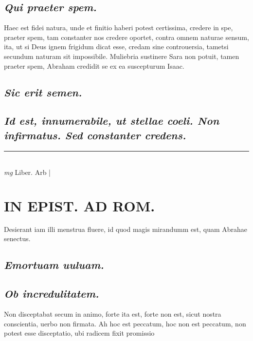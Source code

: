 \documentclass{article}
\begin{document}
\begin{pages}
\subsection*{\textit{Qui praeter spem. }}\pstart Haec est fidei natura, unde et finitio haberi potest certissima, credere in spe, praeter spem, tam constanter nos credere oportet, contra omnem naturae sensum, ita, ut si Deus ignem frigidum dicat esse, credam sine controuersia, tametsi secundum naturam sit impossibile. Muliebria sustinere Sara non potuit, tamen praeter spem, Abraham credidit se ex ea suscepturum Isaac.   \pend
{}
{}
\subsection*{\textit{Sic erit semen. }}
{}
\subsection*{\textit{Id est, innumerabile, ut stellae coeli.  Non infirmatus. Sed constanter credens.  }}
\vspace{0.5cm}\noindent
\vspace{0.2cm}\rule{1cm}{0.2pt}\\ 
\hspace{0.2cm}\textit{mg}
\footnotesize Liber. Arb 
\normalsize| 
\section*{IN EPIST. AD ROM.  }
\marginpar{[ p.45 ]}\pstart Desierant iam illi menstrua fluere, id quod magis mirandumm est, quam Abrahae senectus.   \pend
{}
{}
\subsection*{\textit{Emortuam uuluam. }}
{}
\subsection*{\textit{Ob incredulitatem.  }}\pstart Non disceptabat secum in animo, forte ita est, forte non est, sicut nostra conscientia, uerbo non firmata. Ah hoc est peccatum, hoc non est peccatum, non potest esse disceptatio, ubi radicem fixit promissio\pend
{}
{}

\end{pages}
\end{document}
